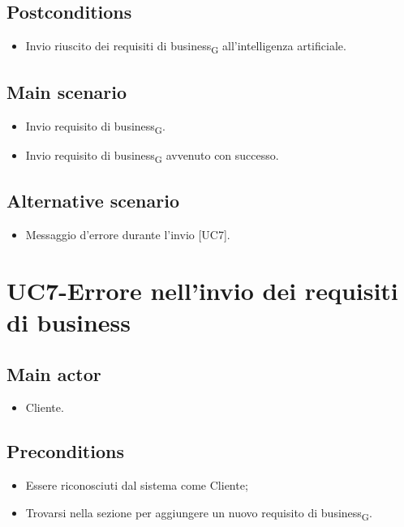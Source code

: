 \documentclass{article}
\begin{document}
     \subsection*{Postconditions} 
        \begin{itemize}
            \item Invio riuscito dei requisiti di business\textsubscript{G} all'intelligenza artificiale.
        \end{itemize}
        
     \subsection*{Main scenario}

        \begin{itemize}
            \item Invio requisito di business\textsubscript{G}.
            \item Invio requisito di business\textsubscript{G} avvenuto con successo.
        \end{itemize}
     \subsection*{Alternative scenario}
        \begin{itemize}
            \item Messaggio d'errore durante l'invio [UC7].
        \end{itemize}

\section{UC7-Errore nell'invio dei requisiti di business}

     \subsection*{Main actor}
     \begin{itemize}
         \item Cliente.
     \end{itemize}
     \subsection*{Preconditions} 
     \begin{itemize}
         \item Essere riconosciuti dal sistema come Cliente;
         \item Trovarsi nella sezione per aggiungere un nuovo requisito di business\textsubscript{G}.
     \end{itemize}
\end{document}
